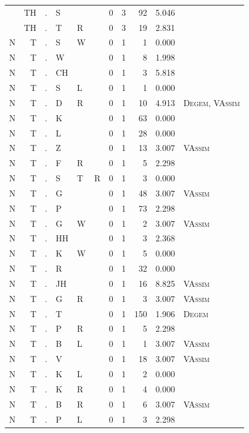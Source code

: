 \documentclass[12pt]{article}
\begin{document}
\begin{longtable}{r@{ } r@{ } c@{ } l@{ } l@{ } l@{ } r r r r l }
 & TH & . & S &  &  & 0 & 3 & 92 & 5.046 &  \\
 & TH & . & T & R &  & 0 & 3 & 19 & 2.831 &  \\
N & T & . & S & W &  & 0 & 1 & 1 & 0.000 &  \\
N & T & . & W &  &  & 0 & 1 & 8 & 1.998 &  \\
N & T & . & CH &  &  & 0 & 1 & 3 & 5.818 &  \\
N & T & . & S & L &  & 0 & 1 & 1 & 0.000 &  \\
N & T & . & D & R &  & 0 & 1 & 10 & 4.913 & \textsc{Degem}, \textsc{VAssim} \\
N & T & . & K &  &  & 0 & 1 & 63 & 0.000 &  \\
N & T & . & L &  &  & 0 & 1 & 28 & 0.000 &  \\
N & T & . & Z &  &  & 0 & 1 & 13 & 3.007 & \textsc{VAssim} \\
N & T & . & F & R &  & 0 & 1 & 5 & 2.298 &  \\
N & T & . & S & T & R & 0 & 1 & 3 & 0.000 &  \\
N & T & . & G &  &  & 0 & 1 & 48 & 3.007 & \textsc{VAssim} \\
N & T & . & P &  &  & 0 & 1 & 73 & 2.298 &  \\
N & T & . & G & W &  & 0 & 1 & 2 & 3.007 & \textsc{VAssim} \\
N & T & . & HH &  &  & 0 & 1 & 3 & 2.368 &  \\
N & T & . & K & W &  & 0 & 1 & 5 & 0.000 &  \\
N & T & . & R &  &  & 0 & 1 & 32 & 0.000 &  \\
N & T & . & JH &  &  & 0 & 1 & 16 & 8.825 & \textsc{VAssim} \\
N & T & . & G & R &  & 0 & 1 & 3 & 3.007 & \textsc{VAssim} \\
N & T & . & T &  &  & 0 & 1 & 150 & 1.906 & \textsc{Degem} \\
N & T & . & P & R &  & 0 & 1 & 5 & 2.298 &  \\
N & T & . & B & L &  & 0 & 1 & 1 & 3.007 & \textsc{VAssim} \\
N & T & . & V &  &  & 0 & 1 & 18 & 3.007 & \textsc{VAssim} \\
N & T & . & K & L &  & 0 & 1 & 2 & 0.000 &  \\
N & T & . & K & R &  & 0 & 1 & 4 & 0.000 &  \\
N & T & . & B & R &  & 0 & 1 & 6 & 3.007 & \textsc{VAssim} \\
N & T & . & P & L &  & 0 & 1 & 3 & 2.298 &  \\

\end{longtable}
\end{document}
